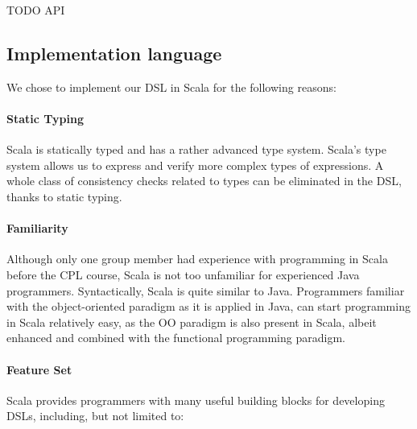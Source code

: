 \documentclass[a4paper]{article}
\begin{document}


TODO API

\subsection{Implementation language}
\label{sec:implementation-language}

We chose to implement our DSL in Scala for the following reasons:

\paragraph{Static Typing}
Scala is statically typed and has a rather advanced type system.
Scala's type system allows us to express and verify more complex types of expressions.
A whole class of consistency checks related to types can be eliminated in the DSL, thanks to static typing.

\paragraph{Familiarity}
Although only one group member had experience with programming in Scala before the \textsc{CPL} course, Scala is not too unfamiliar for experienced Java programmers.
Syntactically, Scala is quite similar to Java.
Programmers familiar with the object-oriented paradigm as it is applied in Java, can start programming in Scala relatively easy, as the \textsc{OO} paradigm is also present in Scala, albeit enhanced and combined with the functional programming paradigm.

\paragraph{Feature Set}
Scala provides programmers with many useful building blocks for developing DSLs, including, but not limited to:
\end{document}
